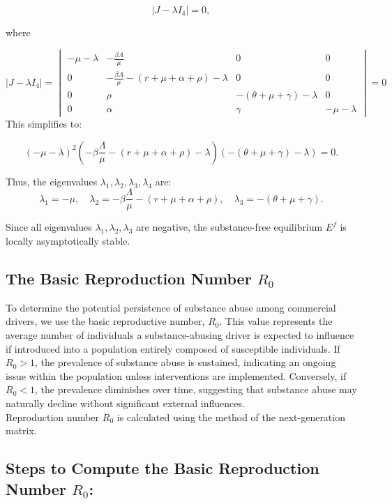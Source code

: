 \documentclass[12pt]{report}
\begin{document}
\[
|J - \lambda I_4| = 0,
\]

where

\[
\left| J - \lambda I_4 \right| = \begin{vmatrix}
	-\mu - \lambda & -\frac{\beta \Lambda}{\mu} & 0 & 0 \\
	0 & -\frac{\beta \Lambda}{\mu} - (r + \mu + \alpha + \rho) - \lambda & 0 & 0 \\
	0 & \rho & -(\theta + \mu + \gamma) - \lambda & 0 \\
	
	0 & \alpha & \gamma & -\mu - \lambda
\end{vmatrix} = 0
\]
This simplifies to:

\[
(-\mu - \lambda)^2 (-\beta \frac{\Lambda}{\mu} - (r + \mu + \alpha + \rho) - \lambda) (-(\theta + \mu + \gamma) - \lambda) = 0.
\]

Thus, the eigenvalues \( \lambda_1, \lambda_2, \lambda_3, \lambda_4 \) are:
\[
\lambda_1 = -\mu, \quad \lambda_2 = -\beta \frac{\Lambda}{\mu} - (r + \mu + \alpha + \rho), \quad \lambda_3 = -(\theta + \mu + \gamma).
\]

Since all eigenvalues \( \lambda_1, \lambda_2, \lambda_3 \) are negative, the substance-free equilibrium \( E^f \) is locally asymptotically stable.

\subsection{The Basic Reproduction Number \( R_0 \)}
To determine the potential persistence of substance abuse among commercial drivers, we use the basic reproductive number, \( R_0 \). This value represents the average number of individuals a substance-abusing driver is expected to influence if introduced into a population entirely composed of susceptible individuals. If \( R_0 > 1 \), the prevalence of substance abuse is sustained, indicating an ongoing issue within the population unless interventions are implemented. Conversely, if \( R_0 < 1 \), the prevalence diminishes over time, suggesting that substance abuse may naturally decline without significant external influences.\\
Reproduction number \( R_0 \) is calculated using the method of the next-generation matrix.

\subsection*{Steps to Compute the Basic Reproduction Number \( R_0 \):}
\end{document}
